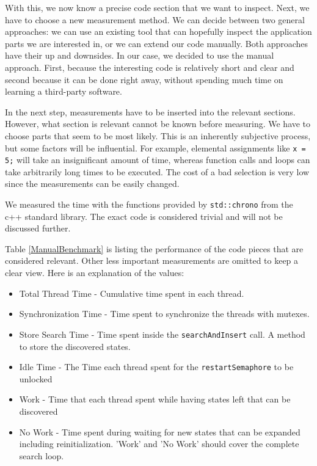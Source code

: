 With this, we now know a precise code section that we want to inspect. Next, we have to choose a new measurement method. We can decide between two general approaches: we can use an existing tool that can hopefully inspect the application parts we are interested in, or we can extend our code manually. Both approaches have their up and downsides. In our case, we decided to use the manual approach. First, because the interesting code is relatively short and clear and second because it can be done right away, without spending much time on learning a third-party software.

In the next step, measurements have to be inserted into the relevant sections. However, what section is relevant cannot be known before measuring. We have to choose parts that seem to be most likely. This is an inherently subjective process, but some factors will be influential. For example, elemental assignments like \texttt{x = 5;} will take an insignificant amount of time, whereas function calls and loops can take arbitrarily long times to be executed. The cost of a bad selection is very low since the measurements can be easily changed.

We measured the time with the functions provided by \texttt{std::chrono} from the c++ standard library. The exact code is considered trivial and will not be discussed further.

Table \ref{ManualBenchmark} is listing the performance of the code pieces that are considered relevant. Other less important measurements are omitted to keep a clear view. Here is an explanation of the values:
\begin{itemize}
    \item Total Thread Time - Cumulative time spent in each thread.
    \item Synchronization Time - Time spent to synchronize the threads with mutexes.
    \item Store Search Time - Time spent inside the \texttt{searchAndInsert} call. A method to store the discovered states.
    \item Idle Time - The Time each thread spent for the \texttt{restartSemaphore} to be unlocked
    \item Work - Time that each thread spent while having states left that can be discovered
    \item No Work - Time spent during waiting for new states that can be expanded including reinitialization. 'Work' and  'No Work' should cover the complete search loop.
\end{itemize}

